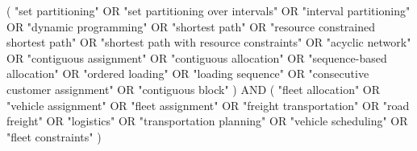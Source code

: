 (
    "set partitioning"
        OR "set partitioning over intervals"
        OR "interval partitioning"
        OR "dynamic programming"
        OR "shortest path"
        OR "resource constrained
           shortest path"
        OR "shortest path with
           resource constraints"
        OR "acyclic network"
        OR "contiguous assignment"
        OR "contiguous allocation"
        OR "sequence-based allocation"
        OR "ordered loading"
        OR "loading sequence"
        OR "consecutive customer assignment"
        OR "contiguous block"
) AND (
    "fleet allocation"
        OR "vehicle assignment"
        OR "fleet assignment"
        OR "freight transportation"
        OR "road freight"
        OR "logistics"
        OR "transportation planning"
        OR "vehicle scheduling"
        OR "fleet constraints"
)
